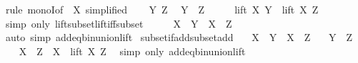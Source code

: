 \begin{isabellebody}
%
\isadelimproof
%
\endisadelimproof
%
\isatagproof
{}\isamarkupfalse%
\ {\isacharparenleft}{\kern0pt}rule\ monoI{\isacharbrackleft}{\kern0pt}of\ {\isachardoublequoteopen}{\isacharparenleft}{\kern0pt}{\isacharplus}{\kern0pt}{\isacharparenright}{\kern0pt}\ X{\isachardoublequoteclose}{\isacharcomma}{\kern0pt}\ simplified{\isacharbrackright}{\kern0pt}{\isacharparenright}{\kern0pt}\isanewline
\ \ \isamarkupfalse%
\ Y\ Z\ \isamarkupfalse%
\ {\isachardoublequoteopen}Y\ {\isasymsubseteq}\ Z{\isachardoublequoteclose}\isanewline
\ \ \isamarkupfalse%
\ \isamarkupfalse%
\ {\isachardoublequoteopen}lift\ X\ Y\ {\isasymsubseteq}\ lift\ X\ Z{\isachardoublequoteclose}\ \isamarkupfalse%
\ {\isacharparenleft}{\kern0pt}simp\ only{\isacharcolon}{\kern0pt}\ lift{\isacharunderscore}{\kern0pt}subset{\isacharunderscore}{\kern0pt}lift{\isacharunderscore}{\kern0pt}iff{\isacharunderscore}{\kern0pt}subset{\isacharparenright}{\kern0pt}\isanewline
\ \ \isamarkupfalse%
\ \isamarkupfalse%
\ {\isachardoublequoteopen}X\ {\isacharplus}{\kern0pt}\ Y\ {\isasymsubseteq}\ X\ {\isacharplus}{\kern0pt}\ Z{\isachardoublequoteclose}\ \isamarkupfalse%
\ {\isacharparenleft}{\kern0pt}auto\ simp{\isacharcolon}{\kern0pt}\ add{\isacharunderscore}{\kern0pt}eq{\isacharunderscore}{\kern0pt}bin{\isacharunderscore}{\kern0pt}union{\isacharunderscore}{\kern0pt}lift{\isacharparenright}{\kern0pt}\isanewline
{}\isamarkupfalse%
%
\endisatagproof
{\isafoldproof}%
%
\isadelimproof
\isanewline
%
\endisadelimproof
\isanewline
{}\isamarkupfalse%
\ subset{\isacharunderscore}{\kern0pt}if{\isacharunderscore}{\kern0pt}add{\isacharunderscore}{\kern0pt}subset{\isacharunderscore}{\kern0pt}add{\isacharcolon}{\kern0pt}\isanewline
\ \ \ {\isachardoublequoteopen}X\ {\isacharplus}{\kern0pt}\ Y\ {\isasymsubseteq}\ X\ {\isacharplus}{\kern0pt}\ Z{\isachardoublequoteclose}\isanewline
\ \ \ {\isachardoublequoteopen}Y\ {\isasymsubseteq}\ Z{\isachardoublequoteclose}\isanewline
%
\isadelimproof
%
\endisadelimproof
%
\isatagproof
{}\isamarkupfalse%
{\isacharminus}{\kern0pt}\isanewline
\ \ \isamarkupfalse%
\ {\isachardoublequoteopen}X\ {\isacharplus}{\kern0pt}\ Z\ {\isacharequal}{\kern0pt}\ X\ {\isasymunion}\ lift\ X\ Z{\isachardoublequoteclose}\ \isamarkupfalse%
\ {\isacharparenleft}{\kern0pt}simp\ only{\isacharcolon}{\kern0pt}\ add{\isacharunderscore}{\kern0pt}eq{\isacharunderscore}{\kern0pt}bin{\isacharunderscore}{\kern0pt}union{\isacharunderscore}{\kern0pt}lift{\isacharparenright}{\kern0pt}\isanewline

\end{isabellebody}
